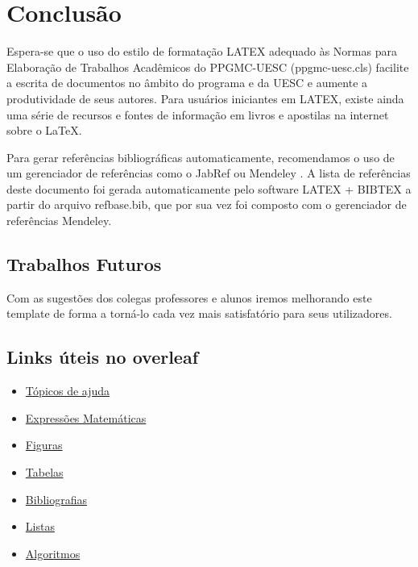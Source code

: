 %
\chapter{Conclusão}\label{chap:conclusao}
Espera-se que o uso do estilo de formatação LATEX adequado às Normas para Elaboração de Trabalhos Acadêmicos do PPGMC-UESC ({\ttfamily ppgmc-uesc.cls}) facilite a escrita de documentos no âmbito do programa e da UESC e aumente a produtividade de seus autores. Para usuários iniciantes em LATEX, existe ainda uma série de recursos  e fontes de informação em livros e apostilas na internet sobre o \LaTeX \cite{CTAN214,Wikibooks14}.


Para gerar referências bibliográficas automaticamente, recomendamos o uso de um gerenciador de referências como o JabRef \cite{JabRef} ou Mendeley \cite{Mendeley}. A lista de referências deste documento foi gerada automaticamente pelo software LATEX + BIBTEX a partir do arquivo {\ttfamily refbase.bib}, que por sua vez foi composto com o gerenciador de referências Mendeley.

\section{Trabalhos Futuros}
\label{sec:trabalhosFuturos}

Com as sugestões dos colegas professores e alunos iremos melhorando este template de forma a torná-lo cada vez mais satisfatório para seus utilizadores.

\section{Links úteis no overleaf}
\begin{multicols}{2}
\begin{itemize}
\item \href{https://pt.overleaf.com/learn/latex/Main_Page}{Tópicos de ajuda}
\item \href{https://pt.overleaf.com/learn/latex/Mathematical_expressions}{Expressões Matemáticas}
\item \href{https://pt.overleaf.com/learn/latex/Inserting_Images}{Figuras}
    \item \href{https://pt.overleaf.com/learn/latex/Tables}{Tabelas}
    \item \href{https://pt.overleaf.com/learn/latex/Bibliography_management_in_LaTeX}{Bibliografias}
    \item \href{https://pt.overleaf.com/learn/latex/Lists}{Listas}
    \item \href{https://pt.overleaf.com/learn/latex/Algorithms}{ Algoritmos}
    \end{itemize}
\end{multicols}
